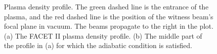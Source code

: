 \documentclass[%
reprint, superscriptaddress,
 amsmath,amssymb, aps,
prstab,
]{revtex4-2}
\begin{document}
\begin{figure} 
    \caption{Plasma density profile. The green dashed line is the entrance
 of the plasma, and the red dashed line is the position of the witness
 beam's focal plane in vacuum. The beams propagate to the right in the
 plot. (a) The FACET II plasma density profile. (b) The middle part of the profile in (a) for which the adiabatic condition is satisfied.}
    \label{fig:plasma_density_profile} 
\end{figure}
\end{document}
